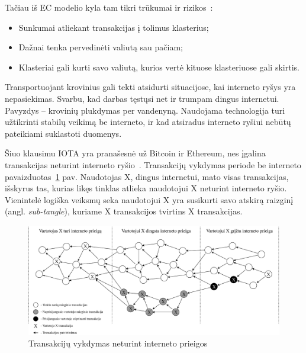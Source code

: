 Tačiau iš EC modelio kyla tam tikri trūkumai ir rizikos~\cite{sergey2018economic}: 
\begin{itemize}
    \item Sunkumai atliekant transakcijas į tolimus klasterius;
    \item Dažnai tenka pervedinėti valiutą sau pačiam;
    \item Klasteriai gali kurti savo valiutą, kurios vertė kituose klasteriuose gali skirtis.
\end{itemize} 




 \label{subsection:dag-offline}

Transportuojant krovinius gali tekti atsidurti situacijose, kai interneto ryšys yra nepasiekimas. Svarbu, kad darbas tęstųsi net ir trumpam dingus internetui. Pavyzdys – krovinių plukdymas per vandenyną. Naudojama technologija turi užtikrinti stabilų veikimą be interneto, ir kad atsiradus interneto ryšiui nebūtų pateikiami suklastoti duomenys.

Šiuo klausimu IOTA yra pranašesnė už Bitcoin ir Ethereum, nes įgalina transakcijas neturint interneto ryšio~\cite{zivic2019distributed}. Transakcijų vykdymas periode be interneto pavaizduotas~\ref{img:11} pav. Naudotojas X, dingus internetui, mato visas transakcijas, išskyrus tas, kurias likęs tinklas atlieka naudotojui X neturint interneto ryšio. Vienintelė logiška veiksmų seka naudotojui X yra susikurti savo atskirą raizginį (angl. \textit{sub-tangle}), kuriame X transakcijos tvirtins X transakcijas.

\begin{figure}[H]
    \centering
    \includegraphics[scale=0.6]{images/offline-tangle}
    \caption{Transakcijų vykdymas neturint interneto prieigos}
    \label{img:11}
\end{figure}

